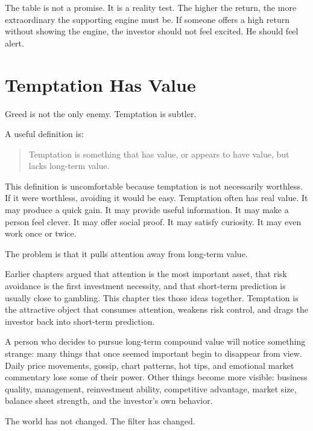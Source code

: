 The table is not a promise. It is a reality test. The higher the return, the more extraordinary the supporting engine must be. If someone offers a high return without showing the engine, the investor should not feel excited. He should feel alert.

\section*{Temptation Has Value}

Greed is not the only enemy. Temptation is subtler.

A useful definition is:

\begin{quote}
Temptation is something that has value, or appears to have value, but lacks long-term value.
\end{quote}

This definition is uncomfortable because temptation is not necessarily worthless. If it were worthless, avoiding it would be easy. Temptation often has real value. It may produce a quick gain. It may provide useful information. It may make a person feel clever. It may offer social proof. It may satisfy curiosity. It may even work once or twice.

The problem is that it pulls attention away from long-term value.

Earlier chapters argued that attention is the most important asset, that risk avoidance is the first investment necessity, and that short-term prediction is usually close to gambling. This chapter ties those ideas together. Temptation is the attractive object that consumes attention, weakens risk control, and drags the investor back into short-term prediction.

A person who decides to pursue long-term compound value will notice something strange: many things that once seemed important begin to disappear from view. Daily price movements, gossip, chart patterns, hot tips, and emotional market commentary lose some of their power. Other things become more visible: business quality, management, reinvestment ability, competitive advantage, market size, balance sheet strength, and the investor's own behavior.

The world has not changed. The filter has changed.

